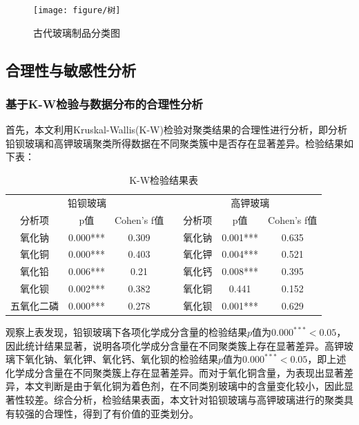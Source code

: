 \documentclass[withoutpreface,bwprint]{cumcmthesis} %
\begin{document}
\begin{figure}[H]
  \centering
  \texttt{[image: figure/树]}
  \caption{古代玻璃制品分类图}
  \label{shu}
\end{figure}

\subsection{合理性与敏感性分析}

\subsubsection{基于K-W检验与数据分布的合理性分析}

首先，本文利用Kruskal-Wallis(K-W)检验对聚类结果的合理性进行分析，即分析铅钡玻璃和高钾玻璃聚类所得数据在不同聚类簇中是否存在显著差异。检验结果如下表：
\begin{table}[H]
  \centering
  \caption{K-W检验结果表}
  \begin{tabular}{ccccccc}
    \toprule[1.5pt]
    \multicolumn{3}{c}{铅钡玻璃}      &  & \multicolumn{3}{c}{高钾玻璃}    \\ \cline{1-3} \cline{5-7} 
    分析项   & p值       & Cohen's f值 &  & 分析项 & p值       & Cohen's f值 \\ \hline
    氧化钠   & 0.000*** & 0.309      &  & 氧化钠 & 0.001*** & 0.635      \\
    氧化铜   & 0.000*** & 0.403      &  & 氧化钾 & 0.004*** & 0.521      \\
    氧化铅   & 0.006*** & 0.21       &  & 氧化钙 & 0.008*** & 0.395      \\
    氧化钡   & 0.002*** & 0.382      &  & 氧化铜 & 0.441    & 0.152      \\
    五氧化二磷 & 0.000*** & 0.278      &  & 氧化钡 & 0.001*** & 0.629      \\ \bottomrule[1.5pt]
  \end{tabular}
\end{table}

观察上表发现，铅钡玻璃下各项化学成分含量的检验结果$p$值为$0.000^{***}<0.05$，因此统计结果显著，说明各项化学成分含量在不同聚类簇上存在显著差异。高钾玻璃下氧化钠、氧化钾、氧化钙、氧化钡的检验结果$p$值为$0.000^{***}<0.05$，即上述化学成分含量在不同聚类簇上存在显著差异。而对于氧化铜含量，为表现出显著差异，本文判断是由于氧化铜为着色剂，在不同类别玻璃中的含量变化较小，因此显著性较差。综合分析，检验结果表面，本文针对铅钡玻璃与高钾玻璃进行的聚类具有较强的合理性，得到了有价值的亚类划分。
\end{document}
